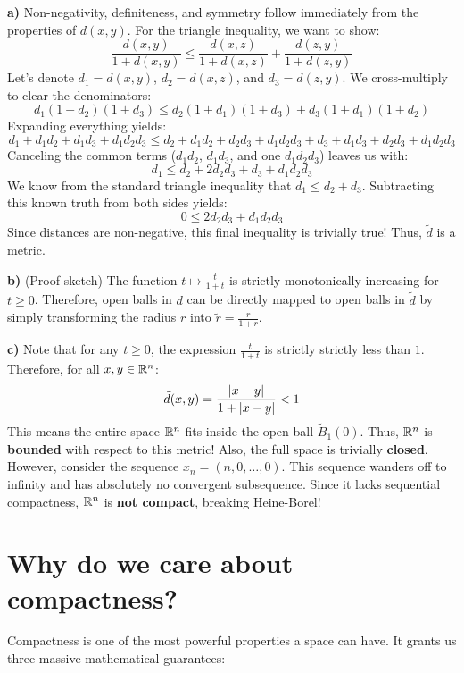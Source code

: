 \begin{solution}
\textbf{a)} Non-negativity, definiteness, and symmetry follow immediately from the properties of $d(x,y)$. 
For the triangle inequality, we want to show:
\[ \frac{d(x,y)}{1+d(x,y)} \le \frac{d(x,z)}{1+d(x,z)} + \frac{d(z,y)}{1+d(z,y)} \]
Let's denote $d_1 = d(x,y)$, $d_2 = d(x,z)$, and $d_3 = d(z,y)$. We cross-multiply to clear the denominators:
\[ d_1(1+d_2)(1+d_3) \le d_2(1+d_1)(1+d_3) + d_3(1+d_1)(1+d_2) \]
Expanding everything yields:
\[ d_1 + d_1 d_2 + d_1 d_3 + d_1 d_2 d_3 \le d_2 + d_1 d_2 + d_2 d_3 + d_1 d_2 d_3 + d_3 + d_1 d_3 + d_2 d_3 + d_1 d_2 d_3 \]
Canceling the common terms ($d_1 d_2$, $d_1 d_3$, and one $d_1 d_2 d_3$) leaves us with:
\[ d_1 \le d_2 + 2d_2 d_3 + d_3 + d_1 d_2 d_3 \]
We know from the standard triangle inequality that $d_1 \le d_2 + d_3$. Subtracting this known truth from both sides yields:
\[ 0 \le 2d_2 d_3 + d_1 d_2 d_3 \]
Since distances are non-negative, this final inequality is trivially true! Thus, $\tilde{d}$ is a metric.

\vspace{0.3cm}
\textbf{b)} \textcolor{eGray}{(Proof sketch)} The function $t \mapsto \frac{t}{1+t}$ is strictly monotonically increasing for $t \ge 0$. Therefore, open balls in $d$ can be directly mapped to open balls in $\tilde{d}$ by simply transforming the radius $r$ into $\tilde{r} = \frac{r}{1+r}$.

\vspace{0.3cm}
\textbf{c)} Note that for any $t \ge 0$, the expression $\frac{t}{1+t}$ is strictly strictly less than $1$. Therefore, for all $x,y \in \mathbb{R}^n$:
\[ \tilde{d}(x,y) = \frac{\lvert x-y\rvert}{1+\lvert x-y\rvert} < 1 \]
This means the entire space $\mathbb{R}^n$ fits inside the open ball $\tilde{B}_1(0)$. Thus, $\mathbb{R}^n$ is \textbf{bounded} with respect to this metric! Also, the full space is trivially \textbf{closed}. 
However, consider the sequence $x_n = (n, 0, \dots, 0)$. This sequence wanders off to infinity and has absolutely no convergent subsequence. Since it lacks sequential compactness, $\mathbb{R}^n$ is \textbf{not compact}, breaking Heine-Borel!
\end{solution}

\hrulefill

\section{Why do we care about compactness?}

Compactness is one of the most powerful properties a space can have. It grants us three massive mathematical guarantees:

